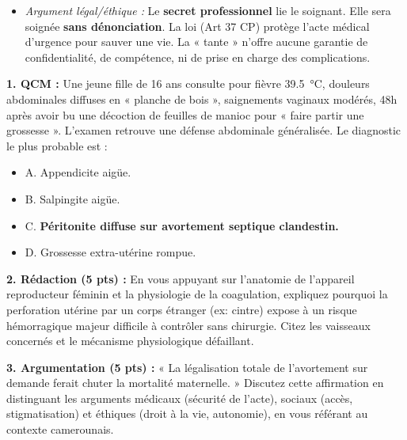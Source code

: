 \documentclass[11pt]{article}
\begin{document}
\begin{exoresolu}
\begin{enumerate}
\begin{itemize}
        \item \textit{Argument légal/éthique :} Le \textbf{secret professionnel} lie le soignant. Elle sera soignée \textbf{sans dénonciation}. La loi (Art 37 CP) protège l'acte médical d'urgence pour sauver une vie. La « tante » n'offre aucune garantie de confidentialité, de compétence, ni de prise en charge des complications.
    \end{itemize}
\end{enumerate}
\end{exoresolu}

\begin{exercice}
\textbf{1. QCM :} Une jeune fille de 16 ans consulte pour fièvre \SI{39,5}{\celsius}, douleurs abdominales diffuses en « planche de bois », saignements vaginaux modérés, 48h après avoir bu une décoction de feuilles de manioc pour « faire partir une grossesse ». L'examen retrouve une défense abdominale généralisée. Le diagnostic le plus probable est :
\begin{itemize}
    \item A. Appendicite aigüe.
    \item B. Salpingite aigüe.
    \item C. \textbf{Péritonite diffuse sur avortement septique clandestin.}
    \item D. Grossesse extra-utérine rompue.
\end{itemize}

\textbf{2. Rédaction (5 pts) :} En vous appuyant sur l'anatomie de l'appareil reproducteur féminin et la physiologie de la coagulation, expliquez pourquoi la perforation utérine par un corps étranger (ex: cintre) expose à un risque hémorragique majeur difficile à contrôler sans chirurgie. Citez les vaisseaux concernés et le mécanisme physiologique défaillant.

\textbf{3. Argumentation (5 pts) :} « La légalisation totale de l'avortement sur demande ferait chuter la mortalité maternelle. » Discutez cette affirmation en distinguant les arguments médicaux (sécurité de l'acte), sociaux (accès, stigmatisation) et éthiques (droit à la vie, autonomie), en vous référant au contexte camerounais.
\end{exercice}
\end{document}
